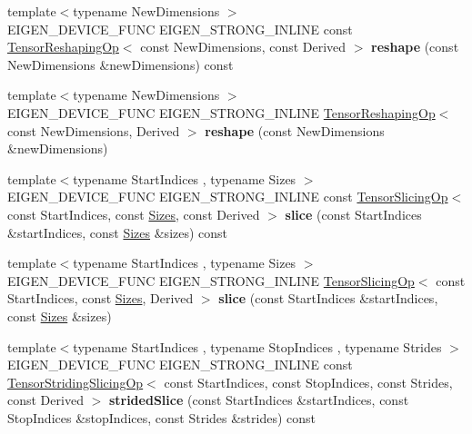 \begin{DoxyCompactItemize}
{\footnotesize template$<$typename New\+Dimensions $>$ }\\E\+I\+G\+E\+N\+\_\+\+D\+E\+V\+I\+C\+E\+\_\+\+F\+U\+NC E\+I\+G\+E\+N\+\_\+\+S\+T\+R\+O\+N\+G\+\_\+\+I\+N\+L\+I\+NE const \hyperlink{class_eigen_1_1_tensor_reshaping_op}{Tensor\+Reshaping\+Op}$<$ const New\+Dimensions, const Derived $>$ {\bfseries reshape} (const New\+Dimensions \&new\+Dimensions) const
\item 
\mbox{\label{class_eigen_1_1_tensor_base_afc966748350735d918a45bf13c214d25}} 
{\footnotesize template$<$typename New\+Dimensions $>$ }\\E\+I\+G\+E\+N\+\_\+\+D\+E\+V\+I\+C\+E\+\_\+\+F\+U\+NC E\+I\+G\+E\+N\+\_\+\+S\+T\+R\+O\+N\+G\+\_\+\+I\+N\+L\+I\+NE \hyperlink{class_eigen_1_1_tensor_reshaping_op}{Tensor\+Reshaping\+Op}$<$ const New\+Dimensions, Derived $>$ {\bfseries reshape} (const New\+Dimensions \&new\+Dimensions)
\item 
\mbox{\label{class_eigen_1_1_tensor_base_a834af784d043394a9c65e6688c0a40b8}} 
{\footnotesize template$<$typename Start\+Indices , typename Sizes $>$ }\\E\+I\+G\+E\+N\+\_\+\+D\+E\+V\+I\+C\+E\+\_\+\+F\+U\+NC E\+I\+G\+E\+N\+\_\+\+S\+T\+R\+O\+N\+G\+\_\+\+I\+N\+L\+I\+NE const \hyperlink{class_eigen_1_1_tensor_slicing_op}{Tensor\+Slicing\+Op}$<$ const Start\+Indices, const \hyperlink{struct_eigen_1_1_sizes}{Sizes}, const Derived $>$ {\bfseries slice} (const Start\+Indices \&start\+Indices, const \hyperlink{struct_eigen_1_1_sizes}{Sizes} \&sizes) const
\item 
\mbox{\label{class_eigen_1_1_tensor_base_a958a115d2ea37b6530b27122db3c2f8b}} 
{\footnotesize template$<$typename Start\+Indices , typename Sizes $>$ }\\E\+I\+G\+E\+N\+\_\+\+D\+E\+V\+I\+C\+E\+\_\+\+F\+U\+NC E\+I\+G\+E\+N\+\_\+\+S\+T\+R\+O\+N\+G\+\_\+\+I\+N\+L\+I\+NE \hyperlink{class_eigen_1_1_tensor_slicing_op}{Tensor\+Slicing\+Op}$<$ const Start\+Indices, const \hyperlink{struct_eigen_1_1_sizes}{Sizes}, Derived $>$ {\bfseries slice} (const Start\+Indices \&start\+Indices, const \hyperlink{struct_eigen_1_1_sizes}{Sizes} \&sizes)
\item 
\mbox{\label{class_eigen_1_1_tensor_base_a4b464fb077d13f81ff83b9989a27e639}} 
{\footnotesize template$<$typename Start\+Indices , typename Stop\+Indices , typename Strides $>$ }\\E\+I\+G\+E\+N\+\_\+\+D\+E\+V\+I\+C\+E\+\_\+\+F\+U\+NC E\+I\+G\+E\+N\+\_\+\+S\+T\+R\+O\+N\+G\+\_\+\+I\+N\+L\+I\+NE const \hyperlink{class_eigen_1_1_tensor_striding_slicing_op}{Tensor\+Striding\+Slicing\+Op}$<$ const Start\+Indices, const Stop\+Indices, const Strides, const Derived $>$ {\bfseries strided\+Slice} (const Start\+Indices \&start\+Indices, const Stop\+Indices \&stop\+Indices, const Strides \&strides) const

\end{DoxyCompactItemize}
